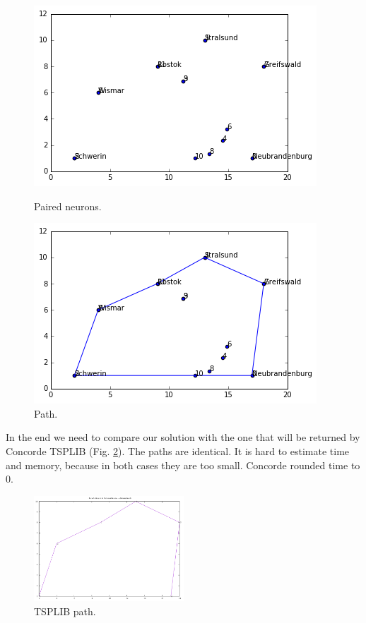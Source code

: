 \documentclass[a4paper, 12pt]{article}
\begin{document}
\begin{figure}[!htb]
  \includegraphics[width=\linewidth]{neuronsWithCities}
  \caption{Paired neurons.}\label{fig:neuronsWithCities}
\endminipage\hfill
{}
  \includegraphics[width=\linewidth]{path}
  \caption{Path.}\label{fig:path}
\endminipage\hfill
\end{figure}

In the end we need to compare our solution with the one that will be returned by Concorde TSPLIB (Fig. \ref{pathConcorde}). The paths are identical. It is hard to estimate time and memory, because in both cases they are too small. Concorde rounded time to 0.

\begin{figure}[h]
  \centering
  \caption{TSPLIB path.\label{pathConcorde}}
  \includegraphics[width=0.5\textwidth]{pathConcorde}
\end{figure}
\end{document}
